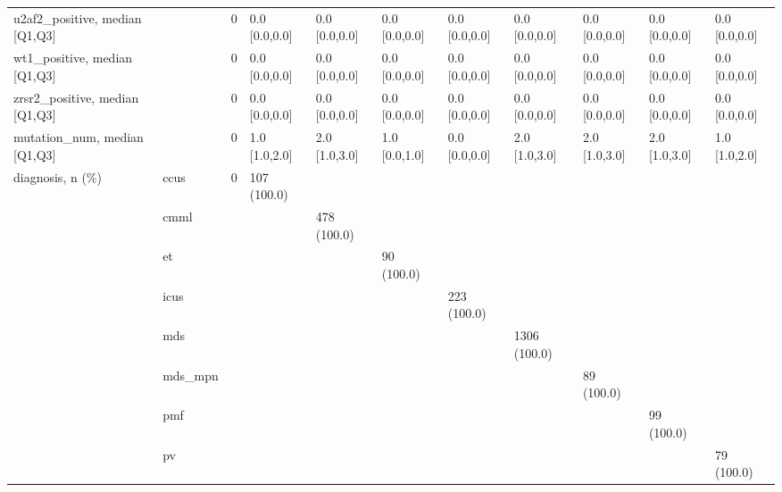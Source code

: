 \begin{tabular}{lllllllllll}
u2af2\_positive, median [Q1,Q3] &    &                    0 &       0.0 [0.0,0.0] &      0.0 [0.0,0.0] &        0.0 [0.0,0.0] &       0.0 [0.0,0.0] &     0.0 [0.0,0.0] &     0.0 [0.0,0.0] &       0.0 [0.0,0.0] &        0.0 [0.0,0.0] \\
wt1\_positive, median [Q1,Q3] &    &                    0 &       0.0 [0.0,0.0] &      0.0 [0.0,0.0] &        0.0 [0.0,0.0] &       0.0 [0.0,0.0] &     0.0 [0.0,0.0] &     0.0 [0.0,0.0] &       0.0 [0.0,0.0] &        0.0 [0.0,0.0] \\
zrsr2\_positive, median [Q1,Q3] &    &                    0 &       0.0 [0.0,0.0] &      0.0 [0.0,0.0] &        0.0 [0.0,0.0] &       0.0 [0.0,0.0] &     0.0 [0.0,0.0] &     0.0 [0.0,0.0] &       0.0 [0.0,0.0] &        0.0 [0.0,0.0] \\
mutation\_num, median [Q1,Q3] &    &                    0 &       1.0 [1.0,2.0] &      2.0 [1.0,3.0] &        1.0 [0.0,1.0] &       0.0 [0.0,0.0] &     2.0 [1.0,3.0] &     2.0 [1.0,3.0] &       2.0 [1.0,3.0] &        1.0 [1.0,2.0] \\
diagnosis, n (\%) & ccus &                    0 &         107 (100.0) &                    &                      &                     &                   &                   &                     &                      \\
                 & cmml &                      &                     &        478 (100.0) &                      &                     &                   &                   &                     &                      \\
                 & et &                      &                     &                    &           90 (100.0) &                     &                   &                   &                     &                      \\
                 & icus &                      &                     &                    &                      &         223 (100.0) &                   &                   &                     &                      \\
                 & mds &                      &                     &                    &                      &                     &      1306 (100.0) &                   &                     &                      \\
                 & mds\_mpn &                      &                     &                    &                      &                     &                   &        89 (100.0) &                     &                      \\
                 & pmf &                      &                     &                    &                      &                     &                   &                   &          99 (100.0) &                      \\
                 & pv &                      &                     &                    &                      &                     &                   &                   &                     &           79 (100.0) \\
\bottomrule
\end{tabular}
